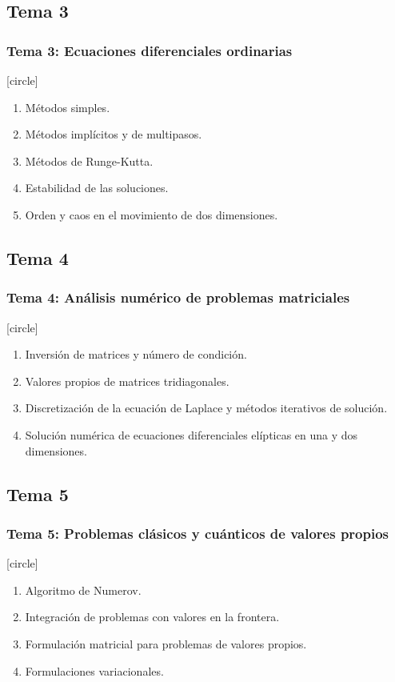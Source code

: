 \documentclass[12pt]{beamer}
\begin{document}
\subsection*{Tema 3}
\begin{frame}
\frametitle{\textbf{Tema 3: Ecuaciones diferenciales ordinarias}}
[circle]
\begin{enumerate}[<+->]
\item Métodos simples.
\item Métodos implícitos y de multipasos.
\item Métodos de Runge-Kutta.
\item Estabilidad de las soluciones.
\item Orden y caos en el movimiento de dos dimensiones.
\end{enumerate}
\end{frame}
\subsection*{Tema 4}
\begin{frame}
\frametitle{\textbf{Tema 4: Análisis numérico de problemas matriciales}}
[circle]
\begin{enumerate}[<+->]
\item Inversión de matrices y número de condición.
\item Valores propios de matrices tridiagonales.
\item Discretización de la ecuación de Laplace y métodos iterativos de solución.
\item Solución numérica de ecuaciones diferenciales elípticas en una y dos dimensiones.
\end{enumerate}
\end{frame}
\subsection*{Tema 5}
\begin{frame}
\frametitle{\textbf{Tema 5: Problemas clásicos y cuánticos de valores propios}}
[circle]
\begin{enumerate}[<+->]
\item Algoritmo de Numerov.
\item Integración de problemas con valores en la frontera.
\item Formulación matricial para problemas de valores propios.
\item Formulaciones variacionales.
\end{enumerate}
\end{frame}
\end{document}

